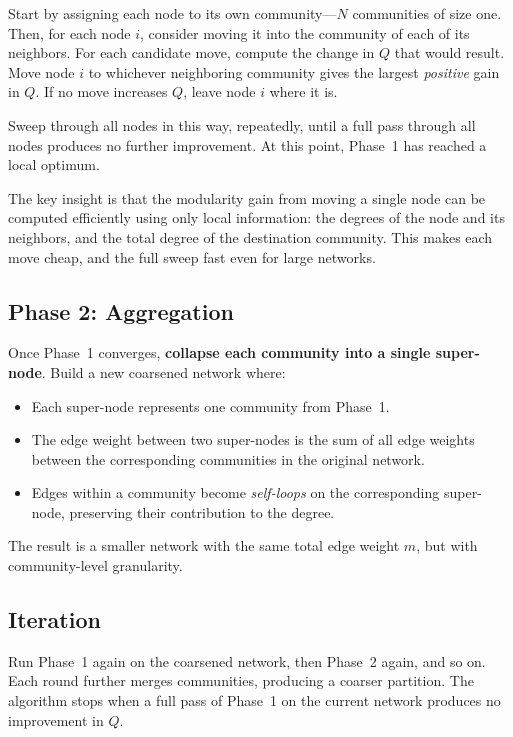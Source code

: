 \documentclass[11pt]{article}
\theoremstyle{definition}
\begin{document}
Start by assigning each node to its own community---$N$ communities of size one. Then, for each node $i$, consider moving it into the community of each of its neighbors. For each candidate move, compute the change in $Q$ that would result. Move node $i$ to whichever neighboring community gives the largest \emph{positive} gain in $Q$. If no move increases $Q$, leave node $i$ where it is.

Sweep through all nodes in this way, repeatedly, until a full pass through all nodes produces no further improvement. At this point, Phase~1 has reached a local optimum.

\begin{intubox}
The key insight is that the modularity gain from moving a single node can be computed efficiently using only local information: the degrees of the node and its neighbors, and the total degree of the destination community. This makes each move cheap, and the full sweep fast even for large networks.
\end{intubox}

\subsection{Phase 2: Aggregation}

Once Phase~1 converges, \textbf{collapse each community into a single super-node}. Build a new coarsened network where:
\begin{itemize}[leftmargin=2em]
  \item Each super-node represents one community from Phase~1.
  \item The edge weight between two super-nodes is the sum of all edge weights between the corresponding communities in the original network.
  \item Edges within a community become \emph{self-loops} on the corresponding super-node, preserving their contribution to the degree.
\end{itemize}
The result is a smaller network with the same total edge weight $m$, but with community-level granularity.

\subsection{Iteration}

Run Phase~1 again on the coarsened network, then Phase~2 again, and so on. Each round further merges communities, producing a coarser partition. The algorithm stops when a full pass of Phase~1 on the current network produces no improvement in $Q$.
\end{document}
